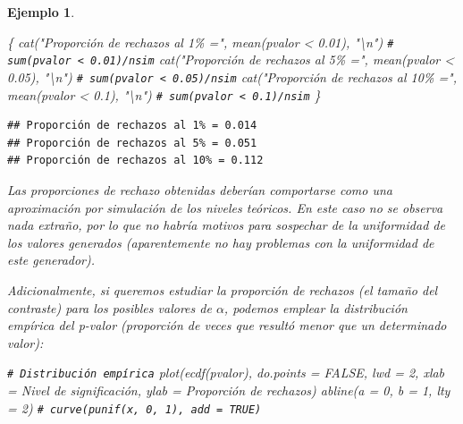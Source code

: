 \documentclass[
]{book}
\newenvironment{Shaded}{\begin{snugshade}}{\end{snugshade}}
\newcommand{\AttributeTok}[1]{\textcolor[rgb]{0.77,0.63,0.00}{#1}}
\newcommand{\CommentTok}[1]{\textcolor[rgb]{0.56,0.35,0.01}{\textit{#1}}}
\newcommand{\ConstantTok}[1]{\textcolor[rgb]{0.00,0.00,0.00}{#1}}
\newcommand{\DecValTok}[1]{\textcolor[rgb]{0.00,0.00,0.81}{#1}}
\newcommand{\FloatTok}[1]{\textcolor[rgb]{0.00,0.00,0.81}{#1}}
\newcommand{\FunctionTok}[1]{\textcolor[rgb]{0.00,0.00,0.00}{#1}}
\newcommand{\NormalTok}[1]{#1}
\newcommand{\SpecialCharTok}[1]{\textcolor[rgb]{0.00,0.00,0.00}{#1}}
\newcommand{\StringTok}[1]{\textcolor[rgb]{0.31,0.60,0.02}{#1}}
\theoremstyle{break}
\newtheorem{example}{Ejemplo}[chapter]
\theoremstyle{nonumberplain}
\renewcommand{\CommentTok}[1]{\textcolor[rgb]{0.41,0.41,0.41}{\texttt{#1}}}
\begin{document}
\begin{example}
\begin{Shaded}
\begin{Highlighting}[]
\NormalTok{\{}
\FunctionTok{cat}\NormalTok{(}\StringTok{"Proporción de rechazos al 1\% ="}\NormalTok{, }\FunctionTok{mean}\NormalTok{(pvalor }\SpecialCharTok{\textless{}} \FloatTok{0.01}\NormalTok{), }\StringTok{"}\SpecialCharTok{\textbackslash{}n}\StringTok{"}\NormalTok{) }\CommentTok{\# sum(pvalor \textless{} 0.01)/nsim}
\FunctionTok{cat}\NormalTok{(}\StringTok{"Proporción de rechazos al 5\% ="}\NormalTok{, }\FunctionTok{mean}\NormalTok{(pvalor }\SpecialCharTok{\textless{}} \FloatTok{0.05}\NormalTok{), }\StringTok{"}\SpecialCharTok{\textbackslash{}n}\StringTok{"}\NormalTok{)   }\CommentTok{\# sum(pvalor \textless{} 0.05)/nsim}
\FunctionTok{cat}\NormalTok{(}\StringTok{"Proporción de rechazos al 10\% ="}\NormalTok{, }\FunctionTok{mean}\NormalTok{(pvalor }\SpecialCharTok{\textless{}} \FloatTok{0.1}\NormalTok{), }\StringTok{"}\SpecialCharTok{\textbackslash{}n}\StringTok{"}\NormalTok{)   }\CommentTok{\# sum(pvalor \textless{} 0.1)/nsim}
\NormalTok{\}}
\end{Highlighting}
\end{Shaded}

\begin{verbatim}
## Proporción de rechazos al 1% = 0.014 
## Proporción de rechazos al 5% = 0.051 
## Proporción de rechazos al 10% = 0.112
\end{verbatim}

Las proporciones de rechazo obtenidas deberían comportarse como una aproximación por simulación de los niveles teóricos.
En este caso no se observa nada extraño, por lo que no habría motivos para sospechar de la uniformidad de los valores generados (aparentemente no hay problemas con la uniformidad de este generador).

Adicionalmente, si queremos estudiar la proporción de rechazos (el \emph{tamaño del contraste}) para los posibles valores de \(\alpha\), podemos emplear la distribución empírica del p-valor (proporción de veces que resultó menor que un determinado valor):

\begin{Shaded}
\begin{Highlighting}[]
\CommentTok{\# Distribución empírica}
\FunctionTok{plot}\NormalTok{(}\FunctionTok{ecdf}\NormalTok{(pvalor), }\AttributeTok{do.points =} \ConstantTok{FALSE}\NormalTok{, }\AttributeTok{lwd =} \DecValTok{2}\NormalTok{, }
     \AttributeTok{xlab =} \StringTok{\textquotesingle{}Nivel de significación\textquotesingle{}}\NormalTok{, }\AttributeTok{ylab =} \StringTok{\textquotesingle{}Proporción de rechazos\textquotesingle{}}\NormalTok{)}
\FunctionTok{abline}\NormalTok{(}\AttributeTok{a =} \DecValTok{0}\NormalTok{, }\AttributeTok{b =} \DecValTok{1}\NormalTok{, }\AttributeTok{lty =} \DecValTok{2}\NormalTok{)   }\CommentTok{\# curve(punif(x, 0, 1), add = TRUE)}
\end{Highlighting}
\end{Shaded}


\end{example}
\end{document}
